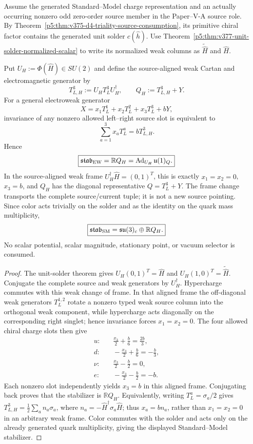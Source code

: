 \documentclass[12pt,a4paper]{article}
\begin{document}
\begin{theorem}
\label{p5:thm:v377-occurring-solder-em-stabilizer}
Assume the generated Standard--Model charge representation and an actually
occurring nonzero odd zero-order source member in the Paper--V-A source role.
By Theorem~\ref{p5:thm:v375-d4-triality-source-consumption}, its primitive
chiral factor contains the generated unit solder \(c(\hat h)\).  Use
Theorem~\ref{p5:thm:v377-unit-solder-normalized-scalar} to write its normalized
weak columns as \(\widetilde{\widehat H}\) and \(\widehat H\).

Put \(U_H:=\Phi(\widehat H)\in SU(2)\) and define the source-aligned
weak Cartan and electromagnetic generator by
\[
 T_{L,H}^3:=U_HT_L^3U_H^\dagger,
 \qquad Q_H:=T_{L,H}^3+Y.
\]
For a general electroweak generator
\[
 X=x_1T_L^1+x_2T_L^2+x_3T_L^3+bY,
\]
invariance of any nonzero allowed left--right source slot is equivalent to
\[
 \sum_{a=1}^3x_aT_L^a=bT_{L,H}^3.
\]
Hence
\[
 \boxed{\mathfrak{stab}_{\rm EW}=\mathbb R Q_H
 =\operatorname{Ad}_{U_H}\mathfrak u(1)_Q.}
\]
In the source-aligned weak frame \(U_H^\dagger\widehat H=(0,1)^T\),
this is exactly \(x_1=x_2=0\), \(x_3=b\), and \(Q_H\) has the
diagonal representative \(Q=T_L^3+Y\).  The frame change transports
the complete source/current tuple; it is not a new source pointing.
Since color acts trivially on the solder and as the identity on the quark
mass multiplicity,
\[
 \boxed{\mathfrak{stab}_{\rm SM}
 =\mathfrak{su}(3)_c\oplus\mathbb R Q_H.}
\]
No scalar potential, scalar magnitude, stationary point, or vacuum selector
is consumed.
\end{theorem}

\begin{proof}
The unit-solder theorem gives
\(U_H(0,1)^T=\widehat H\) and
\(U_H(1,0)^T=\widetilde{\widehat H}\).
Conjugate the complete source and weak generators by \(U_H^\dagger\).
Hypercharge commutes with this weak change of frame.  In that aligned frame
the off-diagonal weak generators \(T_L^{1,2}\) rotate a nonzero typed weak
source column into the orthogonal weak component, while hypercharge acts
diagonally on the corresponding right singlet; hence invariance forces
\(x_1=x_2=0\).  The four allowed chiral charge slots then give
\[
\begin{aligned}
 u:&\quad \frac{x_3}{2}+\frac b6=\frac{2b}{3},\\
 d:&\quad-\frac{x_3}{2}+\frac b6=-\frac b3,\\
 \nu:&\quad\frac{x_3}{2}-\frac b2=0,\\
 e:&\quad-\frac{x_3}{2}-\frac b2=-b.
\end{aligned}
\]
Each nonzero slot independently yields \(x_3=b\) in this aligned frame.
Conjugating back proves that the stabilizer is \(\mathbb R Q_H\).
Equivalently, writing \(T_L^a=\sigma_a/2\) gives
\(T_{L,H}^3=\frac12\sum_an_a\sigma_a\), where
\(n_a=-\widehat H^\dagger\sigma_a\widehat H\); thus
\(x_a=bn_a\), rather than \(x_1=x_2=0\) in an arbitrary weak frame.
Color commutes with the solder and acts only on the
already generated quark multiplicity, giving the displayed Standard--Model
stabilizer.
\end{proof}
\end{document}
